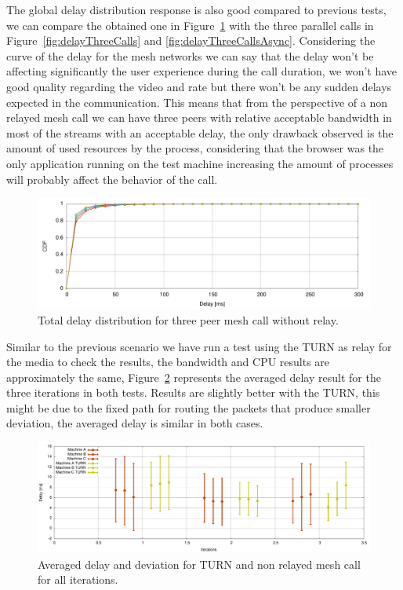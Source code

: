 The global delay distribution response is also good compared to previous tests, we can compare the obtained one in Figure~\ref{fig:delayThreeMesh} with the three parallel calls in Figure~\ref{fig:delayThreeCalls} and \ref{fig:delayThreeCallsAsync}. Considering the curve of the delay for the mesh networks we can say that the delay won't be affecting significantly the user experience during the call duration, we won't have good quality regarding the video and rate but there won't be any sudden delays expected in the communication. This means that from the perspective of a non relayed mesh call we can have three peers with relative acceptable bandwidth in most of the streams with an acceptable delay, the only drawback observed is the amount of used resources by the process, considering that the browser was the only application running on the test machine increasing the amount of processes will probably affect the behavior of the call.

\begin{figure}[h]
  \centering
    \includegraphics[width=1\textwidth]{./figures/mesh_total_delay_distribution.pdf}
      \caption[Total delay distribution for three peer mesh call without relay]{Total delay distribution for three peer mesh call without relay.}
	\label{fig:delayThreeMesh}
\end{figure}

Similar to the previous scenario we have run a test using the TURN as relay for the media to check the results, the bandwidth and CPU results are approximately the same, Figure~\ref{fig:delayThreeMeshNOTURN} represents the averaged delay result for the three iterations in both tests. Results are slightly better with the TURN, this might be due to the fixed path for routing the packets that produce smaller deviation, the averaged delay is similar in both cases.

\begin{figure}[h]
  \centering
    \includegraphics[width=1\textwidth]{./figures/mesh_turnno_mean_deviation_delay.pdf}
      \caption[Averaged delay and deviation for TURN and non relayed mesh call for all iterations]{Averaged delay and deviation for TURN and non relayed mesh call for all iterations.}
	\label{fig:delayThreeMeshNOTURN}
\end{figure}

